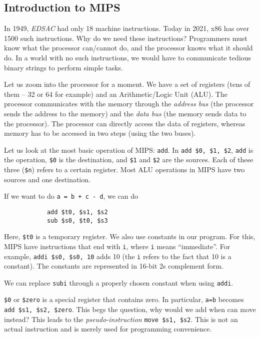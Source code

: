 \documentclass{article}
\begin{document}
	\subsection{Introduction to MIPS}

		In 1949, \emph{EDSAC} had only 18 machine instructions. Today in 2021, x86 has over 1500 such instructions. Why do we need these instructions? Programmers must know what the processor can/cannot do, and the processor knows what it should do. In a world with no such instructions, we would have to communicate tedious binary strings to perform simple tasks. 

		Let us zoom into the processor for a moment. We have a set of registers (tens of them -- 32 or 64 for example) and an Arithmetic/Logic Unit (ALU). The processor communicates with the memory through the \emph{address bus} (the processor sends the address to the memory) and the \emph{data bus} (the memory sends data to the processor). The processor can directly access the data of registers, whereas memory has to be accessed in two steps (using the two buses).

		Let us look at the most basic operation of MIPS: \texttt{add}. In \texttt{add \$0, \$1, \$2}, \texttt{add} is the operation, \texttt{\$0} is the destination, and \texttt{\$1} and \texttt{\$2} are the sources. Each of these three (\texttt{\$n}) refers to a certain register. Most ALU operations in MIPS have two sources and one destination.

		If we want to do \texttt{a = b + c - d}, we can do
		\begin{verbatim}
			add $t0, $s1, $s2
			sub $s0, $t0, $s3
		\end{verbatim}
		Here, \texttt{\$t0} is a temporary register. We also use constants in our program. For this, MIPS have instructions that end with \texttt{i}, where \texttt{i} means ``immediate''. For example, \texttt{addi \$s0, \$s0, 10} adds 10 (the \texttt{i} refers to the fact that 10 is a constant). The constants are represented in 16-bit 2s complement form.

		We can replace \texttt{subi} through a properly chosen constant when using \texttt{addi}.

		\texttt{\$0} or \texttt{\$zero} is a special register that contains zero. In particular, \texttt{a=b} becomes \texttt{add \$s1, \$s2, \$zero}. This begs the question, why would we add when can move instead? This leads to the \emph{pseudo-instruction} \texttt{move \$s1, \$s2}. This is not an actual instruction and is merely used for programming convenience.
\end{document}
